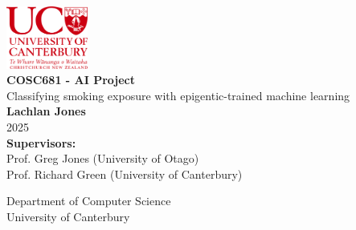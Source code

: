 \documentclass{article}
\begin{document}
\doublespacing



\begin{titlepage}
    \centering
    \singlespacing
    \vspace*{1cm}

    \includegraphics[width=0.2\textwidth]{University_of_Canterbury_logo.svg.png}\\[1.5cm]

    \Huge
    \textbf{COSC681 - AI Project}\\[1.5cm]

    \LARGE
    Classifying smoking exposure with epigentic-trained machine learning\\[2cm]

    \Large
    \textbf{Lachlan Jones}\\[0.5cm]
    2025\\[1cm]

    \large
    \textbf{Supervisors:}\\
    Prof. Greg Jones (University of Otago)\\
    Prof. Richard Green (University of Canterbury)

    \vfill

    \Large
    Department of Computer Science\\
    University of Canterbury
\end{titlepage}


\begin{abstract}

\end{abstract}

\newpage
\tableofcontents
\end{document}
